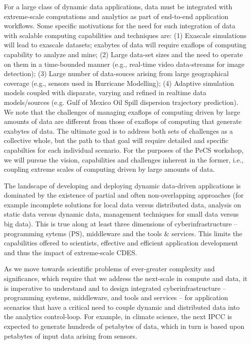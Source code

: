 \documentclass[12pt]{article}
\begin{document}
For a large class of dynamic data applications, data must be
integrated with extreme-scale computations and analytics as part of
end-to-end application workflows. Some specific motivations for the
need for such integration of data with scalable computing capabilities
and techniques are: (1) Exascale simulations will lead to exascale
datasets; exabytes of data will require exaflops of computing
capability to analyze and mine; (2) Large data-set sizes and the need
to operate on them in a time-bounded manner (e.g., real-time video
data-streams for image detection); (3) Large number of data-souces
arising from large geographical coverage (e.g., sensors used in
Hurricane Modelling); (4) Adaptive simulation models coupled with
disparate, varying and refined in realtime data models/sources
(e.g. Gulf of Mexico Oil Spill dispersion trajectory prediction).  We
note that the challenges of managing exaflops of computing driven by
large amounts of data are different from those of exaflops of
computing that generate exabytes of data. The ultimate goal is to
address both sets of challenges as a collective whole, but the path to
that goal will require detailed and specific capabilties for each
individual scenario. For the purposes of the PeCS workshop, we will
pursue the vision, capabilities and challenges inherent in the former,
i.e., coupling extreme scales of computing driven by large amounts of
data.


 The landscape of
developing and deploying dynamic data-driven applications is dominated
by the existence of partial and often non-overlapping approaches (for
example incomplete solutions for local data versus distributed data,
analysis on static data versus dynamic data, management techniques for
small data versus big data). This is true along at least three
dimensions of cyberinfrastructure -- programming sytems (PS),
middleware and the tools \& services. This limits the capabilities
offered to scientists, effective and efficient application development
and thus the impact of extreme-scale CDES.

 As we move towards
scientific problems of ever-greater complexity and significance, which
require that we address the next-scale in compute and data, it is
imperative to understand and to design integrated cyberinfrastructure
-- programming systems, middleware, and tools and services -- for
application scenarios that have a critical need to couple dynamic and
distributed data into the analytics control-loop. For example, in
climate science, the next IPCC is expected to generate hundreds of
petabytes of data, which in turn is based upon petabytes of input data
arising from sensors. 
\end{document}

